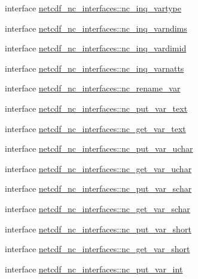 \begin{DoxyCompactItemize}
\item 
interface \hyperlink{interfacenetcdf__nc__interfaces_1_1nc__inq__vartype}{netcdf\+\_\+nc\+\_\+interfaces\+::nc\+\_\+inq\+\_\+vartype}
\item 
interface \hyperlink{interfacenetcdf__nc__interfaces_1_1nc__inq__varndims}{netcdf\+\_\+nc\+\_\+interfaces\+::nc\+\_\+inq\+\_\+varndims}
\item 
interface \hyperlink{interfacenetcdf__nc__interfaces_1_1nc__inq__vardimid}{netcdf\+\_\+nc\+\_\+interfaces\+::nc\+\_\+inq\+\_\+vardimid}
\item 
interface \hyperlink{interfacenetcdf__nc__interfaces_1_1nc__inq__varnatts}{netcdf\+\_\+nc\+\_\+interfaces\+::nc\+\_\+inq\+\_\+varnatts}
\item 
interface \hyperlink{interfacenetcdf__nc__interfaces_1_1nc__rename__var}{netcdf\+\_\+nc\+\_\+interfaces\+::nc\+\_\+rename\+\_\+var}
\item 
interface \hyperlink{interfacenetcdf__nc__interfaces_1_1nc__put__var__text}{netcdf\+\_\+nc\+\_\+interfaces\+::nc\+\_\+put\+\_\+var\+\_\+text}
\item 
interface \hyperlink{interfacenetcdf__nc__interfaces_1_1nc__get__var__text}{netcdf\+\_\+nc\+\_\+interfaces\+::nc\+\_\+get\+\_\+var\+\_\+text}
\item 
interface \hyperlink{interfacenetcdf__nc__interfaces_1_1nc__put__var__uchar}{netcdf\+\_\+nc\+\_\+interfaces\+::nc\+\_\+put\+\_\+var\+\_\+uchar}
\item 
interface \hyperlink{interfacenetcdf__nc__interfaces_1_1nc__get__var__uchar}{netcdf\+\_\+nc\+\_\+interfaces\+::nc\+\_\+get\+\_\+var\+\_\+uchar}
\item 
interface \hyperlink{interfacenetcdf__nc__interfaces_1_1nc__put__var__schar}{netcdf\+\_\+nc\+\_\+interfaces\+::nc\+\_\+put\+\_\+var\+\_\+schar}
\item 
interface \hyperlink{interfacenetcdf__nc__interfaces_1_1nc__get__var__schar}{netcdf\+\_\+nc\+\_\+interfaces\+::nc\+\_\+get\+\_\+var\+\_\+schar}
\item 
interface \hyperlink{interfacenetcdf__nc__interfaces_1_1nc__put__var__short}{netcdf\+\_\+nc\+\_\+interfaces\+::nc\+\_\+put\+\_\+var\+\_\+short}
\item 
interface \hyperlink{interfacenetcdf__nc__interfaces_1_1nc__get__var__short}{netcdf\+\_\+nc\+\_\+interfaces\+::nc\+\_\+get\+\_\+var\+\_\+short}
\item 
interface \hyperlink{interfacenetcdf__nc__interfaces_1_1nc__put__var__int}{netcdf\+\_\+nc\+\_\+interfaces\+::nc\+\_\+put\+\_\+var\+\_\+int}

\end{DoxyCompactItemize}
